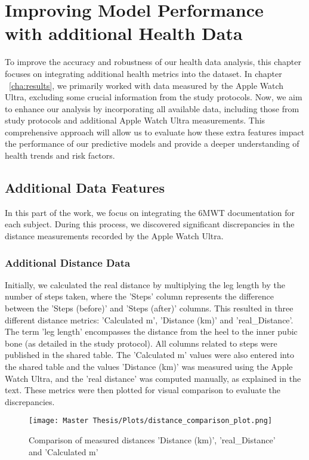 \chapter{Improving Model Performance with additional Health Data}
\label{cha:resultsaddFeatures}

To improve the accuracy and robustness of our health data analysis, this chapter focuses on integrating additional health metrics into the dataset. In chapter ~\ref{cha:results}, we primarily worked with data measured by the Apple Watch Ultra, excluding some crucial information from the study protocols. Now, we aim to enhance our analysis by incorporating all available data, including those from study protocols and additional Apple Watch Ultra measurements. This comprehensive approach will allow us to evaluate how these extra features impact the performance of our predictive models and provide a deeper understanding of health trends and risk factors.

\section{Additional Data Features}

In this part of the work, we focus on integrating the 6MWT documentation for each subject. During this process, we discovered significant discrepancies in the distance measurements recorded by the Apple Watch Ultra. 

\subsection{Additional Distance Data}

Initially, we calculated the real distance by multiplying the leg length by the number of steps taken, where the 'Steps' column represents the difference between the 'Steps (before)' and 'Steps (after)' columns. This resulted in three different distance metrics: 'Calculated m', 'Distance (km)' and 'real\_Distance'.
The term 'leg length' encompasses the distance from the heel to the inner pubic bone (as detailed in the study protocol). All columns related to steps were published in the shared table. The 'Calculated m' values were also entered into the shared table and the values 'Distance (km)' was measured using the Apple Watch Ultra, and the 'real distance' was computed manually, as explained in the text. 
These metrics were then plotted for visual comparison to evaluate the discrepancies.

\FloatBarrier
\begin{figure}[h!]
    \centering
    \texttt{[image: Master Thesis/Plots/distance\_comparison\_plot.png]}
    \caption{Comparison of measured distances 'Distance (km)', ’real_Distance’ and ’Calculated m’}
    \label{fig:distance_comparison_plot}
\end{figure}
\FloatBarrier

